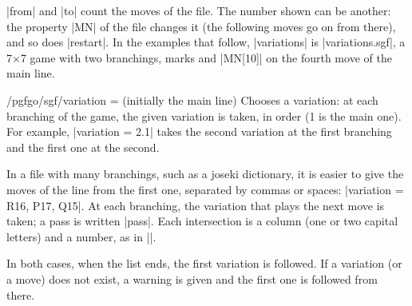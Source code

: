 |from| and |to| count the moves of the file. The number shown can be another: the property |MN| of the file changes it (the following moves go on from there), and so does |restart|. In the examples that follow, |variations| is |variations.sgf|, a 7$\times$7 game with two branchings, marks and |MN[10]| on the fourth move of the main line.

\begin{key}{/pgfgo/sgf/variation =  (initially the main line)}
	Chooses a variation: at each branching of the game, the given variation is taken, in order (1 is the main one). For example, |variation = 2.1| takes the second variation at the first branching and the first one at the second.

	In a file with many branchings, such as a joseki dictionary, it is easier to give the moves of the line from the first one, separated by commas or spaces: |variation = {R16, P17, Q15}|. At each branching, the variation that plays the next move is taken; a pass is written |pass|. Each intersection is a column (one or two capital letters) and a number, as in |\stone|.

	In both cases, when the list ends, the first variation is followed. If a variation (or a move) does not exist, a warning is given and the first one is followed from there.

	\begin{codeexample}[]
		\begin{goban}[sgf size = variations]
		\end{goban}

		\begin{goban}[sgf size = variations]
		\end{goban}

		\begin{goban}[sgf size = variations]
		\end{goban}
	\end{codeexample}
\end{key}


